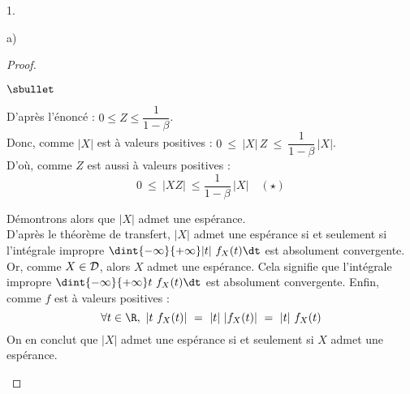 \documentclass[11pt]{article}%
\begin{document}
\begin{noliste}{1.}
\begin{noliste}{a)}
    \begin{proof}~
      \begin{noliste}{$\sbullet$}
      \item D'après l'énoncé : $0 \leq Z \leq \dfrac{1}{1-\beta}$.\\
        Donc, comme $\vert X \vert$ est à valeurs positives : $ 0 \
        \leq \ \vert X \vert \, Z \ \leq \ \dfrac{1}{1-\beta} \,
	\vert X \vert$.\\
	D'où, comme $Z$ est aussi à valeurs positives :
	\[
	  0 \ \leq \ \vert X Z \vert \ \leq \dfrac{1}{1-\beta} \, \vert 
	  X \vert \quad (\star)
	\]

      \item Démontrons alors que $|X|$ admet une espérance.\\
        D'après le théorème de transfert, $|X|$ admet une espérance si
        et seulement si l'intégrale impropre $\dint{-\infty}{+\infty}
        |t| \ f_X(t) \dt$ est absolument convergente.\\[.2cm]
        Or, comme $X \in {\cal D}$, alors $X$ admet une
        espérance. Cela signifie que l'intégrale impropre
        $\dint{-\infty}{+\infty} t \ f_X(t) \dt$ est absolument
        convergente. Enfin, comme $f$ est à valeurs positives :
        \[
        \forall t \in \R, \ |t \ f_X(t)| \ = \ |t| \ |f_X(t)| \ = \
        |t| \ f_X(t)
        \]
        On en conclut que $|X|$ admet une espérance si et seulement si
        $X$ admet une espérance.%


	

\end{noliste}
\end{proof}
\end{noliste}
\end{noliste}
\end{document}
